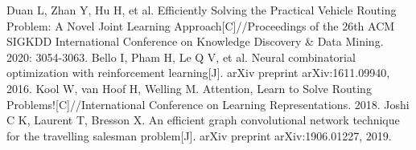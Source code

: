 \documentclass[withoutpreface,bwprint]{cumcmthesis} %
\begin{document}
%
\begin{thebibliography}{99}
	 Duan L, Zhan Y, Hu H, et al. Efficiently Solving the Practical Vehicle Routing Problem: A Novel Joint Learning Approach[C]//Proceedings of the 26th ACM SIGKDD International Conference on Knowledge Discovery \& Data Mining. 2020: 3054-3063.
	 Bello I, Pham H, Le Q V, et al. Neural combinatorial optimization with reinforcement learning[J]. arXiv preprint arXiv:1611.09940, 2016.
	 Kool W, van Hoof H, Welling M. Attention, Learn to Solve Routing Problems![C]//International Conference on Learning Representations. 2018.
	 Joshi C K, Laurent T, Bresson X. An efficient graph convolutional network technique for the travelling salesman problem[J]. arXiv preprint arXiv:1906.01227, 2019.
	

\end{thebibliography}
\end{document}
